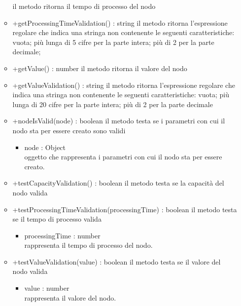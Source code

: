 \begin{itemize}
\begin{itemize}
		il metodo ritorna il tempo di processo del nodo
		\item +getProcessingTimeValidation() : string\newline
		il metodo ritorna l'espressione regolare che indica una stringa non contenente le seguenti caratteristiche: vuota; più lunga di 5 cifre per la parte intera; più di 2 per la parte decimale;
		\item +getValue() : number\newline
		il metodo ritorna il valore del nodo
		\item +getValueValidation() : string\newline
		il metodo ritorna l'espressione regolare che indica una stringa non contenente le seguenti caratteristiche: vuota; più lunga di 20 cifre per la parte intera; più di 2 per la parte decimale
		\item +nodeIsValid(node) : boolean\newline
		il metodo testa se i parametri con cui il nodo sta per essere creato sono validi
		\begin{itemize}
			\item node : Object\\
			oggetto che rappresenta i parametri con cui il nodo sta per essere creato.
		\end{itemize}
		\item +testCapacityValidation() : boolean\newline
		il metodo testa se la capacità del nodo valida
		\item +testProcessingTimeValidation(processingTime) : boolean\newline
		il metodo testa se il tempo di processo valida
		\begin{itemize}
			\item processingTime : number\\
			rappresenta il tempo di processo del nodo.
		\end{itemize}
		\item +testValueValidation(value) : boolean\newline
		il metodo testa se il valore del nodo valida
		\begin{itemize}
			\item value : number\\
			rappresenta il valore del nodo.
		\end{itemize}
	\end{itemize}
\end{itemize}
